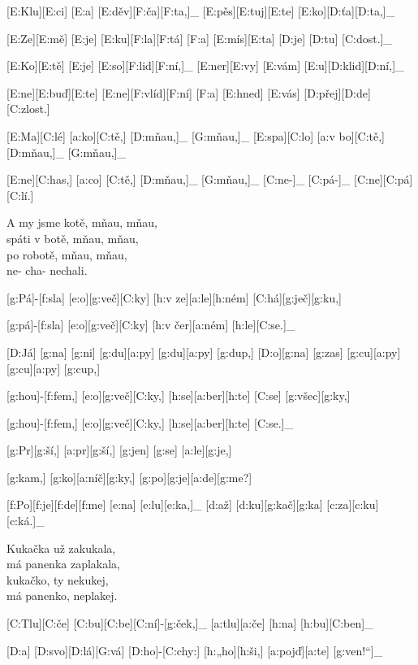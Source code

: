 [E:Klu][E:ci] [E:a] [E:děv][F:ča][F:ta,]_
[E:pěs][E:tuj][E:te] [E:ko][D:ťa][D:ta,]_

[E:Ze][E:mě] [E:je] [E:ku][F:la][F:tá] %
[F:a] [E:mís][E:ta] [D:je] [D:tu] [C:dost.]_

[E:Ko][E:tě] [E:je] [E:so][F:lid][F:ní,]_
[E:ner][E:vy] [E:vám] [E:u][D:klid][D:ní,]_

[E:ne][E:buď][E:te] [E:ne][F:vlíd][F:ní] %
[F:a] [E:hned] [E:vás] [D:přej][D:de] [C:zlost.]

[E:Ma][C:lé] [a:ko][C:tě,] [D:mňau,]_ [G:mňau,]_
[E:spa][C:lo] [a:v bo][C:tě,] [D:mňau,]_ [G:mňau,]_

[E:ne][C:has,] [a:co] [C:tě,] [D:mňau,]_ [G:mňau,]_
[C:ne-]_ [C:pá-]_ [C:ne][C:pá][C:lí.]

A my jsme kotě, mňau, mňau,\\
spáti v botě, mňau, mňau,\\
po robotě, mňau, mňau,\\
ne- cha- nechali.



[g:Pá]-[f:sla] [e:o][g:več][C:ky] [h:v ze][a:le][h:ném] [C:há][g:ječ][g:ku,] %

[g:pá]-[f:sla] [e:o][g:več][C:ky] [h:v čer][a:ném] [h:le][C:se.]_

[D:Já] [g:na] [g:ni] [g:du][a:py] [g:du][a:py] [g:dup,] %
[D:o][g:na] [g:zas] [g:cu][a:py] [g:cu][a:py] [g:cup,]

[g:hou]-[f:fem,] [e:o][g:več][C:ky,] [h:se][a:ber][h:te] [C:se] [g:všec][g:ky,] %

[g:hou]-[f:fem,] [e:o][g:več][C:ky,] [h:se][a:ber][h:te] [C:se.]_



[g:Pr][g:ší,] [a:pr][g:ší,] [g:jen] [g:se] [a:le][g:je,] %

[g:kam,] [g:ko][a:níč][g:ky,] [g:po][g:je][a:de][g:me?] %

[f:Po][f:je][f:de][f:me] [e:na] [e:lu][e:ka,]_
[d:až] [d:ku][g:kač][g:ka] [c:za][c:ku][c:ká.]_

Kukačka už zakukala,\\
má panenka zaplakala,\\
kukačko, ty nekukej,\\
má panenko, neplakej.



[C:Tlu][C:če] [C:bu][C:be][C:ní]-[g:ček,]_
[a:tlu][a:če] [h:na] [h:bu][C:ben]_

[D:a] [D:svo][D:lá][G:vá] [D:ho]-[C:chy:] %
[h:„ho][h:ši,] [a:pojď][a:te] [g:ven!“]_

